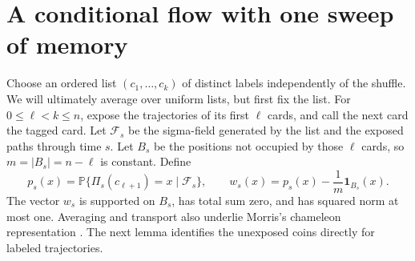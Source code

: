 \documentclass[11pt]{article}
\theoremstyle{remark}
\numberwithin{equation}{section}
\begin{document}
\section{A conditional flow with one sweep of memory}\label{sec:flow}

Choose an ordered list \((c_1,\ldots,c_k)\) of distinct labels independently of the shuffle. We will ultimately average over uniform lists, but first fix the list. For $0\le\ell<k\le n$, expose the trajectories of its first \(\ell\) cards, and call the next card the tagged card. Let $\mathcal F_s$ be the sigma-field generated by the list and the exposed paths through time $s$. Let \(B_s\) be the positions not occupied by those \(\ell\) cards, so \(m=|B_s|=n-\ell\) is constant. Define
\[
 p_s(x)=\mathbb P\{\Pi_s(c_{\ell+1})=x\mid\mathcal F_s\},
 \qquad
 w_s(x)=p_s(x)-\frac1m\mathbf1_{B_s}(x).
\]
The vector \(w_s\) is supported on \(B_s\), has total sum zero, and has squared norm at most one. Averaging and transport also underlie Morris's chameleon representation \cite[Section~4, Lemma~3]{morris44}. The next lemma identifies the unexposed coins directly for labeled trajectories.
\end{document}
